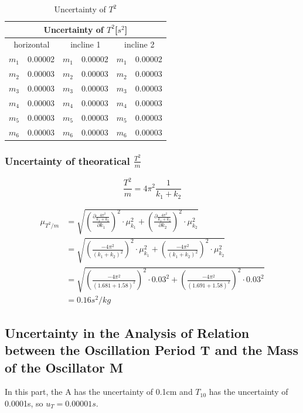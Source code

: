\documentclass[12pt,a4paper]{article}
\begin{document}
\begin{table}[H]
    \centering
    \begin{tabular}{|c|c|c|c|c|c|}\hline
    \multicolumn{6}{|c|}{Uncertainty of $T^2$[$s^2$]}\\\hline 
    \multicolumn{2}{|c|}{horizontal}&\multicolumn{2}{c|}{incline 1}&\multicolumn{2}{c|}{incline 2}\\\hline
    $m_1$&0.00002 &$m_1$& 0.00002 & $m_1$&0.00002 \\\hline
    $m_2$&0.00003 & $m_2$&0.00003 & $m_2$&0.00003 \\\hline
    $m_3$&0.00003 &$m_3$& 0.00003 & $m_3$&0.00003 \\\hline
    $m_4$&0.00003 & $m_4$&0.00003 & $m_4$&0.00003 \\\hline
    $m_5$&0.00003 & $m_5$&0.00003 & $m_5$&0.00003 \\\hline
    $m_6$&0.00003 & $m_6$&0.00003 & $m_6$&0.00003\\\hline
    \end{tabular}
    \caption{Uncertainty of $T^2$}
    \label{Tsquare}
\end{table}

\subsubsection{Uncertainty of theoratical $\frac{T^2}{m}$}

$$\frac{T^2}{m}=4\pi^2\frac{1}{k_1+k_2}$$

\begin{equation*}
    \begin{split}
        \mu_{T^2/m}&=\sqrt{\left(\frac{\partial \frac{4\pi^2}{k_1+k_2}}{\partial k_1}\right)^2\cdot \mu_{k_1}^2+\left(\frac{\partial \frac{4\pi^2}{k_1+k_2}}{\partial k_2}\right)^2\cdot \mu_{k_2}^2}\\
        &=\sqrt{\left(\frac{-4\pi^2}{(k_1+k_2)^2}\right)^2\cdot \mu_{k_1}^2+\left(\frac{-4\pi^2}{(k_1+k_2)^2}\right)^2\cdot \mu_{k_2}^2}\\
        &=\sqrt{\left(\frac{-4\pi^2}{(1.681+1.58)^2}\right)^2\cdot 0.03^2+\left(\frac{-4\pi^2}{(1.691+1.58)^2}\right)^2\cdot 0.03^2}\\
        &=0.16s^2/kg
    \end{split}
\end{equation*}

\subsection{ Uncertainty in the Analysis of Relation between the Oscillation Period T and the Mass of the Oscillator M}
In this part, the A has the uncertainty of 0.1cm and $T_{10}$ has the uncertainty of 0.0001s, so $u_T=0.00001s$. 
\end{document}
